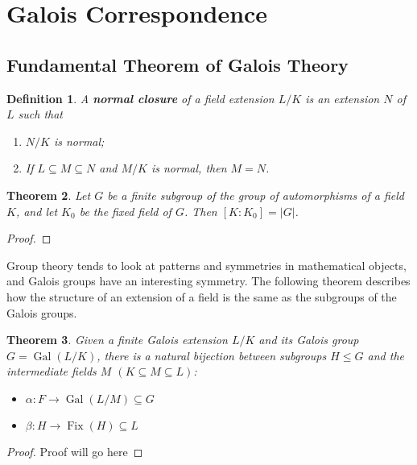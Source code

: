 \documentclass[12pt]{article}
\newtheorem{theorem}{Theorem}
\newtheorem{definition}[theorem]{Definition}
\newcommand{\Gal}{\operatorname{Gal}}
\newcommand{\Fix}{\operatorname{Fix}}
\begin{document}
\section{Galois Correspondence}
\subsection{Fundamental Theorem of Galois Theory}

\begin{definition}
    A \textbf{normal closure} of a field extension $L / K$ is an extension $N$ of $L$ such that 
    \begin{enumerate}
        \item $N / K$ is normal;
        \item If $L \subseteq M \subseteq N$ and $M / K$ is normal, then $M = N$.
    \end{enumerate}
\end{definition}

\begin{theorem}
    Let $G$ be a finite subgroup of the group of automorphisms of a field $K$, and let $K_0$ be the fixed field of $G$. Then $[K : K_0] = |G|$. 
\end{theorem}

\begin{proof}
    
\end{proof}

Group theory tends to look at patterns and symmetries in mathematical objects, and Galois groups have an interesting symmetry. The following theorem describes how the structure of an extension of a field is the same as the subgroups of the Galois groups.

\begin{theorem}
Given a finite Galois extension $L/K$ and its Galois group $G = \Gal(L/K)$, there is a natural bijection between subgroups $H\leq G$ and the intermediate fields $M$ \hspace{0.1cm} $(K \subseteq M \subseteq L)$:

\begin{itemize}
    \item $\alpha:F \to \Gal(L/M) \subseteq G$
    \item $\beta:H \to \Fix(H) \subseteq L$
\end{itemize}
\end{theorem}
\begin{proof}
Proof will go here
\end{proof}
\end{document}
